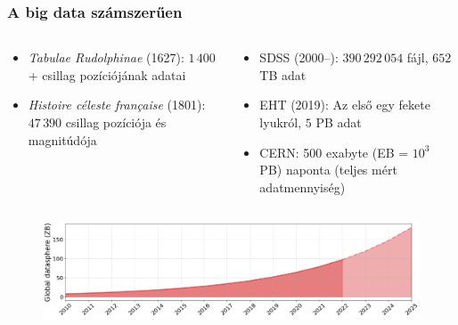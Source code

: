 \begin{frame}
\frametitle{A big data számszerűen}

\begin{columns}
\begin{column}{0.45\textwidth}
	\begin{block}{}
		\begin{itemize}
			\item \textit{Tabulae Rudolphinae} (1627): $1\,400$+ csillag pozíciójának adatai
			\item \textit{Histoire céleste française} (1801): $47\,390$ csillag pozíciója és magnitúdója
			\vspace{1.27em}
		\end{itemize}
	\end{block}
\end{column}
\begin{column}{0.45\textwidth}
    \begin{alertblock}{}
		\begin{itemize}
			\item SDSS (2000--): $390\,292\,054$ fájl, $652$ TB adat
			\item EHT (2019): Az első  egy fekete lyukról, $5$ PB adat
			\item CERN: 500 exabyte (EB = $10^{3}$ PB) naponta (teljes mért adatmennyiség)
		\end{itemize}
	\end{alertblock}
\end{column}
\end{columns}

\begin{figure}
	\includegraphics[width=1.0\textwidth]{img/data-boom.png}
\end{figure}

\end{frame}
